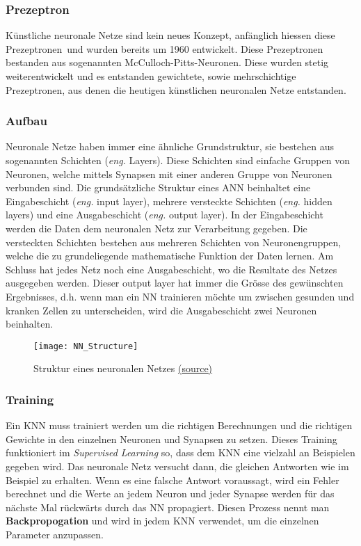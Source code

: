 \subsubsection{Prezeptron}
\label{sub:preceptron}
Künstliche neuronale Netze sind kein neues Konzept, anfänglich hiessen diese \flqq Prezeptronen\frqq \ und wurden
bereits um 1960 entwickelt. Diese Prezeptronen bestanden aus sogenannten McCulloch-Pitts-Neuronen. Diese wurden stetig
weiterentwickelt und es entstanden gewichtete, sowie mehrschichtige Prezeptronen, aus denen die heutigen künstlichen
neuronalen Netze entstanden.

\subsubsection{Aufbau}
\label{sub:structure-nn}
Neuronale Netze haben immer eine ähnliche Grundstruktur, sie bestehen aus sogenannten Schichten (\textit{eng.} Layers).
Diese Schichten sind einfache Gruppen von Neuronen, welche mittels Synapsen mit einer anderen Gruppe von Neuronen
verbunden sind. Die grundsätzliche Struktur eines \gls{ANN} beinhaltet eine Eingabeschicht (\textit{eng.} input layer),
mehrere versteckte Schichten (\textit{eng.} hidden layers) und eine Ausgabeschicht (\textit{eng.} output layer). In der
Eingabeschicht werden die Daten dem neuronalen Netz zur Verarbeitung gegeben. Die versteckten Schichten bestehen aus
mehreren Schichten von Neuronengruppen, welche die zu grundeliegende mathematische Funktion der Daten lernen. Am Schluss
hat jedes Netz noch eine Ausgabeschicht, wo die Resultate des Netzes ausgegeben werden. Dieser output layer hat immer
die Grösse des gewünschten Ergebnisses, d.h. wenn man ein \gls{NN} trainieren möchte um zwischen gesunden und
kranken Zellen zu unterscheiden, wird die Ausgabeschicht zwei Neuronen beinhalten.
\begin{figure}[H]
	\centering
	\texttt{[image: NN\_Structure]}
	\caption{Struktur eines neuronalen Netzes \href{https://upload.wikimedia.org/wikipedia/commons/thumb/4/46/Colored_neural_network.svg/300px-Colored_neural_network.svg.png}{(source)}}
	\label{fig:NN-Structure}
\end{figure}

\subsubsection{Training}
\label{sub:training-nn}
Ein \gls{KNN} muss trainiert werden um die richtigen Berechnungen und die richtigen Gewichte in den
einzelnen Neuronen und Synapsen zu setzen. Dieses Training funktioniert im \textit{Supervised Learning} so, dass dem
\gls{KNN} eine vielzahl an Beispielen gegeben wird. Das neuronale Netz versucht dann, die gleichen Antworten wie im
Beispiel zu erhalten. Wenn es eine falsche Antwort voraussagt, wird ein Fehler berechnet und die Werte an jedem Neuron
und jeder Synapse werden für das nächste Mal rückwärts durch das \gls{NN} propagiert. Diesen Prozess nennt man
\textbf{Backpropogation} und wird in jedem \gls{KNN} verwendet, um die einzelnen Parameter anzupassen.


